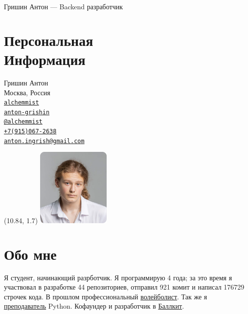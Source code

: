 \documentclass[margin,line]{resume}
\begin{document}
{\sc \large Гришин Антон --- Backend разработчик} \\
\begin{resume}
  \begin{minipage}[t]{0.55\textwidth}
    \section{\mysidestyle Персональная\\Информация}
    Гришин Антон \\
    Москва, Россия \\
    \faGithub  \space
    \href{https://github.com/alchemmist/}{\texttt{alchemmist}} \\
    \faLinkedin \space
    \href{https://www.linkedin.com/in/anton-grishin-6966a8362/}{\texttt{anton-grishin}}
    \\
    \faPaperPlane \space \href{https://t.me/alchemmist}{\texttt{@alchemmist}} \\
    \faPhone \space
    \href{tel:+1234567890}{\color{blue}\texttt{+7(915)067-2638}}  \\
    \faEnvelope \space
    \href{mailto:anton.ingrish@gmail.com}{\color{blue}\texttt{anton.ingrish@gmail.com}}
  \end{minipage}

  \begin{minipage}[H]{0.18\textwidth}
    \begin{textblock}{7}(10.84, 1.7)
      \includegraphics[width=0.27\textwidth]{images/avatar.png}
    \end{textblock}
  \end{minipage}

  \vspace{-5mm}
  \section{\mysidestyle Обо мне}
  Я студент, начинающий разрботчик. Я программирую 4 года; за
  это время я участвовал в разработке 44 репозиториев, отправил 921
  комит и написал
  176729 строчек кода. В прошлом профессиональный
  \href{https://github.com/alchemmist/CV/blob/main/attachments/sport.pdf}{волейболист}.
  Так же я
  \href{https://www.avito.ru/moskva/predlozheniya_uslug/prepodavatel_programmirovaniya_na_python_2556461612}{преподаватель}
  Python. Кофаундер и разработчик в \href{https://ballkit.ru/}{Баллкит}.


\end{resume}
\end{document}
